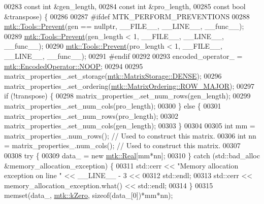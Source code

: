 \begin{DoxyCode}
00283                               \textcolor{keyword}{const} \textcolor{keywordtype}{int} &gen\_length,
00284                               \textcolor{keyword}{const} \textcolor{keywordtype}{int} &pro\_length,
00285                               \textcolor{keyword}{const} \textcolor{keywordtype}{bool} &transpose) \{
00286 
00287 \textcolor{preprocessor}{  #ifdef MTK\_PERFORM\_PREVENTIONS}
00288   \hyperlink{classmtk_1_1Tools_a332324c6f25e66be9dff48c5987a3b9f}{mtk::Tools::Prevent}(gen == \textcolor{keyword}{nullptr}, \_\_FILE\_\_, \_\_LINE\_\_, \_\_func\_\_);
00289   \hyperlink{classmtk_1_1Tools_a332324c6f25e66be9dff48c5987a3b9f}{mtk::Tools::Prevent}(gen\_length < 1, \_\_FILE\_\_, \_\_LINE\_\_, \_\_func\_\_);
00290   \hyperlink{classmtk_1_1Tools_a332324c6f25e66be9dff48c5987a3b9f}{mtk::Tools::Prevent}(pro\_length < 1, \_\_FILE\_\_, \_\_LINE\_\_, \_\_func\_\_);
00291 \textcolor{preprocessor}{  #endif}
00292 
00293   encoded\_operator\_ = \hyperlink{namespacemtk_ga9b50023bfb2692219d2915feade94f80a722d122e81cbbe543bd5520bb8678c0e}{mtk::EncodedOperator::NOOP};
00294 
00295   matrix\_properties\_.set\_storage(\hyperlink{namespacemtk_ga25b67ec6a2afeee69f9bb196a9c66619a0706fbbd929bd8abc4de386c53d439ff}{mtk::MatrixStorage::DENSE});
00296   matrix\_properties\_.set\_ordering(\hyperlink{namespacemtk_ga622801bd9f912d0f976c3e383f5f581ca21541962976d7709c26e9cd8385bd648}{mtk::MatrixOrdering::ROW\_MAJOR});
00297   \textcolor{keywordflow}{if} (!transpose) \{
00298     matrix\_properties\_.set\_num\_rows(gen\_length);
00299     matrix\_properties\_.set\_num\_cols(pro\_length);
00300   \} \textcolor{keywordflow}{else} \{
00301     matrix\_properties\_.set\_num\_rows(pro\_length);
00302     matrix\_properties\_.set\_num\_cols(gen\_length);
00303   \}
00304 
00305   \textcolor{keywordtype}{int} mm = matrix\_properties\_.num\_rows(); \textcolor{comment}{// Used to construct this matrix.}
00306   \textcolor{keywordtype}{int} nn = matrix\_properties\_.num\_cols(); \textcolor{comment}{// Used to construct this matrix.}
00307 
00308   \textcolor{keywordflow}{try} \{
00309     data\_ = \textcolor{keyword}{new} \hyperlink{group__c01-roots_gac080bbbf5cbb5502c9f00405f894857d}{mtk::Real}[mm*nn];
00310   \} \textcolor{keywordflow}{catch} (std::bad\_alloc &memory\_allocation\_exception) \{
00311     std::cerr << \textcolor{stringliteral}{"Memory allocation exception on line "} << \_\_LINE\_\_ - 3 <<
00312       std::endl;
00313     std::cerr << memory\_allocation\_exception.what() << std::endl;
00314   \}
00315   memset(data\_, \hyperlink{group__c01-roots_ga59a451a5fae30d59649bcda274fea271}{mtk::kZero}, \textcolor{keyword}{sizeof}(data\_[0])*mm*nn);

\end{DoxyCode}
